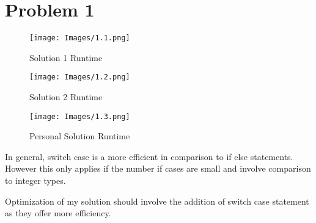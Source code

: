 \clearpage
\section*{Problem 1}

\begin{figure}[!ht]
    \centering
    \texttt{[image: Images/1.1.png]}
    \caption{Solution 1 Runtime}
\end{figure}

\begin{figure}[!ht]
    \centering
    \texttt{[image: Images/1.2.png]}
    \caption{Solution 2 Runtime}
\end{figure}

\begin{figure}[!ht]
    \centering
    \texttt{[image: Images/1.3.png]}
    \caption{Personal Solution Runtime}
\end{figure}

\clearpage
\noindent
In general, switch case is a more efficient in comparison to if else statements. However this only applies if the number if cases are small and involve comparison to integer types.

\noindent
Optimization of my solution should involve the addition of switch case statement as they offer more efficiency.